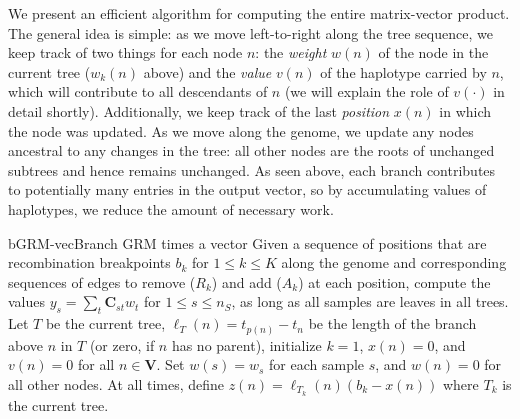 We present an efficient algorithm for computing the entire matrix-vector product.
%
The general idea is simple: as we move left-to-right along the tree sequence,
we keep track of two things for each node $n$:
the \textit{weight} $w(n)$ of the node in the current tree ($w_k(n)$ above) and
the \textit{value} $v(n)$ of the haplotype carried by $n$,
which will contribute to all descendants of $n$ (we will explain the role of $v(\cdot)$ in detail shortly).
%
Additionally, we keep track of the last \textit{position} $x(n)$ in which the node was updated.
%
As we move along the genome, we update any nodes ancestral to any changes in the tree:
all other nodes are the roots of unchanged subtrees and hence remains unchanged.
%
As seen above, each branch contributes to potentially many entries in the output vector,
so by accumulating values of haplotypes, we reduce the amount of necessary work.

\begin{taocpalg}{bGRM-vec}{Branch GRM times a vector}
{
    Given a sequence of positions that are recombination breakpoints $b_k$ for $1 \le k \le K$
    along the genome and corresponding sequences of edges to remove ($R_k$) and add ($A_k$) at each position,
    compute the values
    $y_s=\sum_t\mathbf{C}_{st} w_t$ for $1 \le s \le n_S$, as long as all samples are leaves in all trees.
    Let $T$ be the current tree,
    $\ell_T(n) = t_{p(n)} - t_n$ be the length of the branch above $n$ in $T$ (or zero, if $n$ has no parent),
    initialize $k = 1$, $x(n) = 0$, and $v(n) = 0$ for all $n \in \mathbf{V}$.
    Set $w(s) = w_s$ for each sample $s$, and $w(n)=0$ for all other nodes.
    At all times, define
    $z(n) = \ell_{T_k}(n) (b_k - x(n)) $ where $T_k$ is the current tree.
}




\end{taocpalg}

